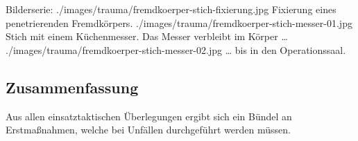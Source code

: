\begin{PictureSeriesWide}{}{Bilderserie: }
{./images/trauma/fremdkoerper-stich-fixierung.jpg}
{Fixierung
eines penetrierenden Fremdkörpers. }
{./images/trauma/fremdkoerper-stich-messer-01.jpg}
{Stich mit einem Küchenmesser. 
Das Messer verbleibt im Körper {\ldots}~
}
{./images/trauma/fremdkoerper-stich-messer-02.jpg}
{{\ldots} bis in den Operationssaal.
}
{}
{}
\end{PictureSeriesWide}


\subsection{Zusammenfassung}
Aus allen einsatztaktischen Überlegungen ergibt sich ein
Bündel an Erstmaßnahmen, welche bei Unfällen durchgeführt
werden müssen.

% 


\clearpage %


\clearpage %
